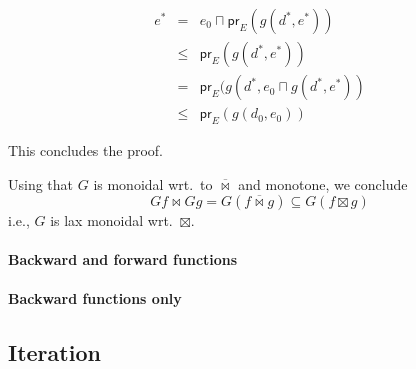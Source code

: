 \documentclass[9pt]{article}
\newcommand{\meet}{\sqcap}
\newcommand{\prE}{\mathsf{pr}_E}
\newcommand{\bowtielift}{\mathbin{\overline{\bowtie}}}
\begin{document}
\begin{eqnarray*}
e^* & = & e_0 \meet \prE(g(d^*,e^*)) \\
& \leq & \prE(g(d^*,e^*)) \\
& = & \prE(g(d^*, e_0 \meet g(d^*,e^*)) \\
& \leq & \prE(g(d_0, e_0))  
\end{eqnarray*}

This concludes the proof.

\bigskip

Using that $G$ is monoidal wrt.\ to $\bowtielift$ and monotone, we
conclude
\[
G f \bowtie G g = G (f \bowtielift g) \subseteq G (f \boxtimes g)
\]
i.e., $G$ is lax monoidal wrt.\ $\boxtimes$.


\paragraph{Backward and forward functions}



\paragraph{Backward functions only}





\subsection*{Iteration}
\end{document}
